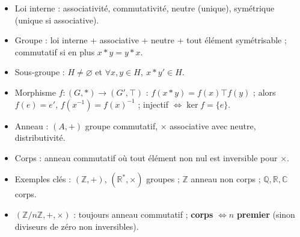 \documentclass[11pt,a4paper]{article}
\begin{document}
\vspace{4mm}
\begin{tcolorbox}[
  enhanced, boxrule=0pt, arc=2mm,
  interior style={left color=qtealdark, right color=qteal},
  left=6mm, right=6mm, top=4mm, bottom=4mm,
  fontupper=\color{white}\sffamily,
  title={\sffamily\bfseries\color{white}\ding{72}~~À retenir},
  colbacktitle=qtealdark, coltitle=white, boxrule=0pt
]
\begin{itemize}[leftmargin=6mm, label={\color{qamber}}, itemsep=1mm]
  \item Loi interne : associativité, commutativité, neutre (unique), symétrique (unique si associative).
  \item Groupe : loi interne + associative + neutre + tout élément symétrisable ; commutatif si en plus $x*y=y*x$.
  \item Sous-groupe : $H\ne\varnothing$ et $\forall x,y\in H,\ x*y'\in H$.
  \item Morphisme $f:(G,*)\to(G',\top)$ : $f(x*y)=f(x)\top f(y)$ ; alors $f(e)=e'$, $f(x^{-1})=f(x)^{-1}$ ; injectif $\iff\ker f=\{e\}$.
  \item Anneau : $(A,+)$ groupe commutatif, $\times$ associative avec neutre, distributivité.
  \item Corps : anneau commutatif où tout élément non nul est inversible pour $\times$.
  \item Exemples clés : $(\mathbb{Z},+)$, $(\mathbb{R}^*,\times)$ groupes ; $\mathbb{Z}$ anneau non corps ; $\mathbb{Q},\mathbb{R},\mathbb{C}$ corps.
  \item $(\mathbb{Z}/n\mathbb{Z},+,\times)$ : toujours anneau commutatif ; \textbf{corps} $\iff n$ \textbf{premier} (sinon diviseurs de zéro non inversibles).
\end{itemize}
\end{tcolorbox}
\end{document}
